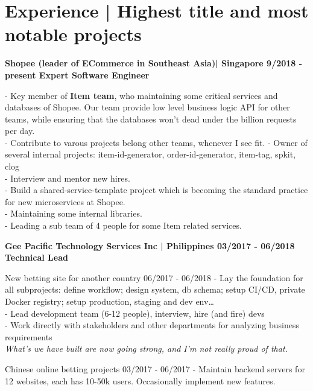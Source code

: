 \section*{Experience | \small{Highest title and most notable projects}}
{%
    \textbf{\event
      {Shopee (leader of ECommerce in Southeast Asia)| Singapore}
      {9/2018 - present}
      {Expert Software Engineer}
    }

  {
    - Key member of \textbf{Item team}, who maintaining some critical services
    and databases of Shopee. Our team provide low level business logic API for
    other teams, while ensuring that the databases won't dead under the billion
    requests per day. \\
    - Contribute to varous projects belong other teams, whenever I see fit.
    - Owner of several internal projects: item-id-generator, order-id-generator,
    item-tag, spkit, clog \\
    - Interview and mentor new hires. \\
    - Build a shared-service-template project which is becoming the standard
    practice for new microservices at Shopee. \\
    - Maintaining some internal libraries. \\
    - Leading a sub team of 4 people for some Item related services.
  }
  \break

  \textbf{\event
    {Gee Pacific Technology Services Inc | Philippines}
    {03/2017 - 06/2018}
    {Technical Lead}
  }

  \event
  {New betting site for another country}
  {06/2017 - 06/2018}
  {
    - Lay the foundation for all subprojects: define workflow; design system,
    db schema; setup CI/CD, private Docker registry; setup production, staging and
      dev env\dots
      \\
    - Lead development team (6-12 people), interview, hire (and fire) devs
      \\
    - Work directly with stakeholders and other departments for analyzing
      business requirements \\
    \textit{What's we have built are now going strong, and I'm not really proud of that.}
  }

  \event
  {Chinese online betting projects}
  {03/2017 - 06/2017}
  {
    - Maintain backend servers for 12 websites, each has 10-50k users. Occasionally implement new features.
  }

}
